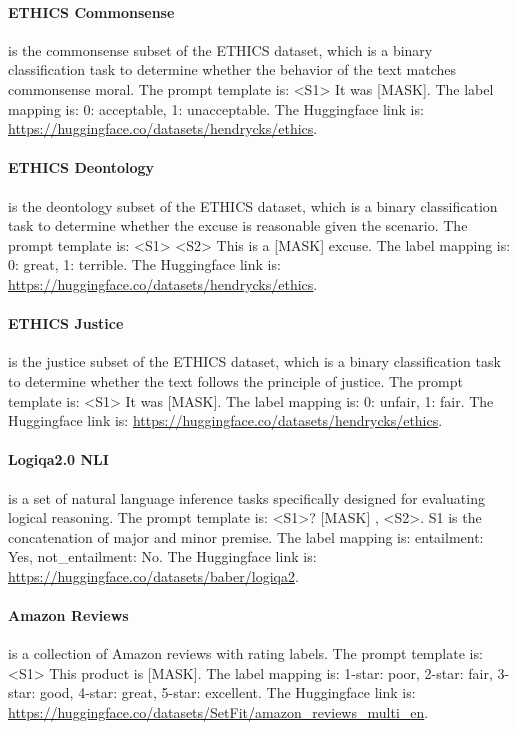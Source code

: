 \paragraph{ETHICS Commonsense} is the commonsense subset of the ETHICS \citep{hendrycks2020aligning} dataset, which is a binary classification task to determine whether the behavior of the text matches commonsense moral. The prompt template is: \textless{}S1\textgreater{} It was {[}MASK{]}. The label mapping is: 0: acceptable, 1: unacceptable. The Huggingface link is: \url{https://huggingface.co/datasets/hendrycks/ethics}.

\paragraph{ETHICS Deontology} is the deontology subset of the ETHICS \citep{hendrycks2020aligning} dataset, which is a binary classification task to determine whether the excuse is reasonable given the scenario. The prompt template is: \textless{}S1\textgreater{} \textless{}S2\textgreater{} This is a {[}MASK{]} excuse. The label mapping is: 0: great, 1: terrible. The Huggingface link is: \url{https://huggingface.co/datasets/hendrycks/ethics}.

\paragraph{ETHICS Justice} is the justice subset of the ETHICS \citep{hendrycks2020aligning} dataset, which is a binary classification task to determine whether the text follows the principle of justice. The prompt template is: \textless{}S1\textgreater{} It was {[}MASK{]}. The label mapping is: 0: unfair, 1: fair. The Huggingface link is: \url{https://huggingface.co/datasets/hendrycks/ethics}.

\paragraph{Logiqa2.0 NLI} \citep{10174688} is a set of natural language inference tasks specifically designed for evaluating logical reasoning. The prompt template is: \textless{}S1\textgreater{}? {[}MASK{]} , \textless{}S2\textgreater{}. S1 is the concatenation of major and minor premise. The label mapping is: entailment: Yes, not\_entailment: No. The Huggingface link is: \url{https://huggingface.co/datasets/baber/logiqa2}. 

\paragraph{Amazon Reviews} is a collection of Amazon reviews with rating labels. The prompt template is: \textless{}S1\textgreater{} This product is {[}MASK{]}.  The label mapping is: 1-star: poor, 2-star: fair, 3-star: good, 4-star: great, 5-star: excellent. The Huggingface link is: \url{https://huggingface.co/datasets/SetFit/amazon_reviews_multi_en}. 

